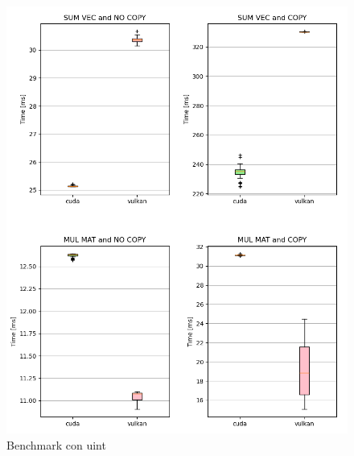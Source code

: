 \begin{figure}[ht]
  \centering
  \includegraphics[width=1\linewidth]{images/chapter4/bench_u32.png}
  \caption{Benchmark con uint}
  \label{fig:bench_u32}
\end{figure}

